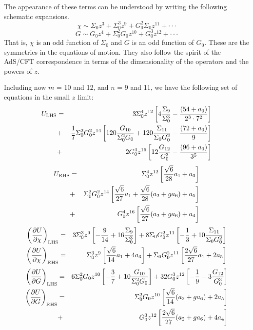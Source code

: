 \documentclass[aps,prd,12pt,nofootinbib]{revtex4}
\newcommand{\ba}{\begin{eqnarray}}
\newcommand{\ea}{\end{eqnarray}}
\newcommand{\bd}{\begin{displaymath}}
\newcommand{\ed}{\end{displaymath}}
\def\rt6{\sqrt{6}}
\begin{document}
The appearance of these terms can be understood by writing the following schematic expansions.
\bd
\chi \sim \Sigma_0 z^3 + \Sigma_0^3 z^9 + G_0^2 \Sigma_0 z^{11} + \cdot\cdot\cdot
\ed
\bd
G \sim G_0 z^4 + \Sigma_0^2 G_0 z^{10} + G_0^3 z^{12} + \cdot\cdot\cdot
\ed
That is, $\chi$ is an odd function of $\Sigma_0$ and $G$ is an odd function of $G_0$.  
These are the symmetries in the equations of motion.  
They also follow the spirit of the AdS/CFT correspondence in terms of the dimensionality of the operators and the powers of $z$.

Including now $m$ = 10 and 12, and $n$ = 9 and 11, we have the following set of equations in the small $z$ limit:
\ba
U_{\rm LHS} &=& 3 \Sigma_0^4 z^{12} \left[ 4 \frac{\Sigma_9}{\Sigma_0^3} - \frac{(54+a_0)}{2^3 \cdot 7^2} \right] \nonumber \\
&+& \frac{1}{7} \Sigma_0^2 G_0^2 z^{14} \left[ 120 \frac{G_{10}}{\Sigma_0^2 G_0} + 120 \frac{\Sigma_{11}}{\Sigma_0 G_0^2} - \frac{(72+a_0)}{9} \right] \nonumber \\
&+& 2G_0^4 z^{16} \left[ 12 \frac{G_{12}}{G_0^3} - \frac{(96+a_0)}{3^5} \right]
\ea
\ba
U_{\rm RHS} &=& \Sigma_0^4 z^{12} \left[  \frac{\rt6}{28} a_1 + a_3\right] \nonumber \\
&+& \Sigma_0^2 G_0^2 z^{14} \left[ \frac{\rt6}{27} a_1 + \frac{\rt6}{28} (a_2 + g a_6) + a_5 \right] \nonumber \\
&+& G_0^4 z^{16} \left[ \frac{\rt6}{27} (a_2 + g a_6) + a_4 \right]
\ea
\ba
\left(\frac{\partial U}{\partial \chi}\right)_{\rm LHS} &=& 3 \Sigma_0^3 z^9 \left[ -\frac{9}{14} + 16 \frac{\Sigma_9}{\Sigma_0^3} \right]+ 8 \Sigma_0 G_0^2 z^{11} \left[ - \frac{1}{3} + 10 \frac{\Sigma_{11}}{\Sigma_0 G_0^2} \right]\\
\left(\frac{\partial U}{\partial \chi}\right)_{\rm RHS} &=& \Sigma_0^3 z^9 \left[ \frac{\rt6}{14} a_1 + 4 a_3  \right]+ \Sigma_0 G_0^2 z^{11} \left[  \frac{2\rt6}{27} a_1 + 2 a_5 \right]
\ea
\ba
\left(\frac{\partial U}{\partial G}\right)_{\rm LHS} &=& 6 \Sigma_0^2 G_0 z^{10} \left[ -\frac{3}{7} + 10 \frac{G_{10}}{\Sigma_0^2 G_0} \right]
+ 32 G_0^3 z^{12} \left[ - \frac{1}{9} + 3 \frac{G_{12}}{G_0^3} \right] \\
\left(\frac{\partial U}{\partial G}\right)_{\rm RHS} &=& \Sigma_0^2 G_0 z^{10} \left[ \frac{\rt6}{14} (a_2 + g a_6) + 2a_5 \right] \\
&+& G_0^3 z^{12} \left[ \frac{2\rt6}{27}  (a_2 + g a_6) + 4a_4 \right]
\ea
\end{document}
